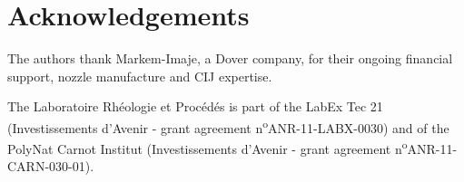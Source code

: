 \documentclass[twocolumn,10pt]{asme2ej}
\begin{document}
\section{Acknowledgements}
The authors thank Markem-Imaje\textcopyright, a {Dover\textregistered} company, for their ongoing financial support, nozzle manufacture and CIJ expertise.

The Laboratoire Rhéologie et Procédés is part of the LabEx Tec 21 (Investissements d'Avenir - grant agreement n\textsuperscript{o}ANR-11-LABX-0030) and of the PolyNat Carnot Institut (Investissements d'Avenir - grant agreement n\textsuperscript{o}ANR-11- CARN-030-01).


\end{document}

